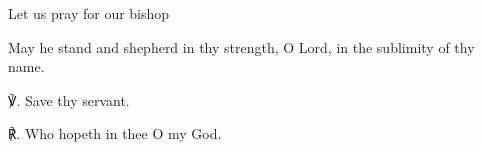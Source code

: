 \begin{enpars}
\vv Let us pray for our bishop \nomen 

\rr May he stand and shepherd in thy strength, O Lord, in the sublimity of thy name.

℣. Save thy servant.

℟. Who hopeth in thee O my God.

\end{enpars}